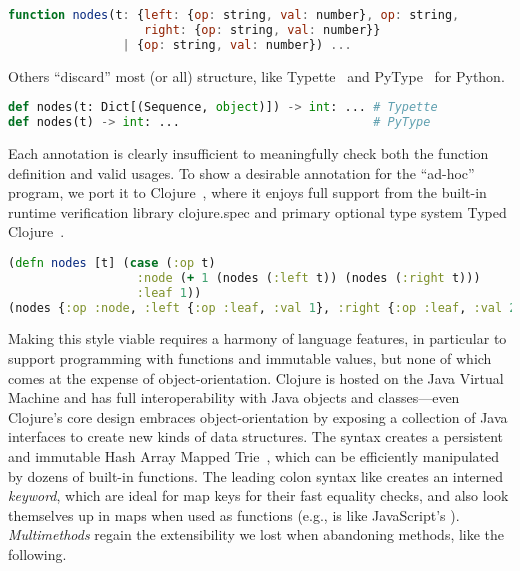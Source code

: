 \begin{lstlisting}[language=JavaScript]
function nodes(t: {left: {op: string, val: number}, op: string,
                   right: {op: string, val: number}}
                | {op: string, val: number}) ...
\end{lstlisting}

Others ``discard'' most (or all) structure, like Typette~ 
and PyType~ for Python.

\begin{lstlisting}[language=Python]
def nodes(t: Dict[(Sequence, object)]) -> int: ... # Typette
def nodes(t) -> int: ...                           # PyType
\end{lstlisting}

Each annotation is clearly insufficient to meaningfully check both the function definition
and valid usages. To show a desirable annotation for the ``ad-hoc'' program,
we port it to Clojure~, where it
enjoys full support from the built-in runtime verification library
clojure.spec and primary optional type system Typed Clojure~.

\begin{lstlisting}[language=Clojure]
(defn nodes [t] (case (:op t)
                  :node (+ 1 (nodes (:left t)) (nodes (:right t)))
                  :leaf 1))
(nodes {:op :node, :left {:op :leaf, :val 1}, :right {:op :leaf, :val 2}}) ;=>3
\end{lstlisting}

Making this style viable requires a harmony of language features, in particular to
support programming with functions and immutable values, but
none of which comes at the expense of object-orientation. Clojure is hosted on the Java Virtual Machine
and has full interoperability with Java objects and classes---even Clojure's core design embraces
object-orientation by exposing a collection of Java interfaces to create new kinds of data structures.
The  syntax creates a persistent and immutable Hash Array Mapped Trie~\cite{bagwell2001ideal},
which can be efficiently manipulated by dozens of built-in functions.
The leading colon syntax like  creates an interned \emph{keyword}, which are ideal for map keys
for their fast equality checks, and also look themselves up in maps when used as functions
(e.g.,  is like JavaScript's ).
\emph{Multimethods} regain the extensibility we lost when abandoning methods, like the following.

